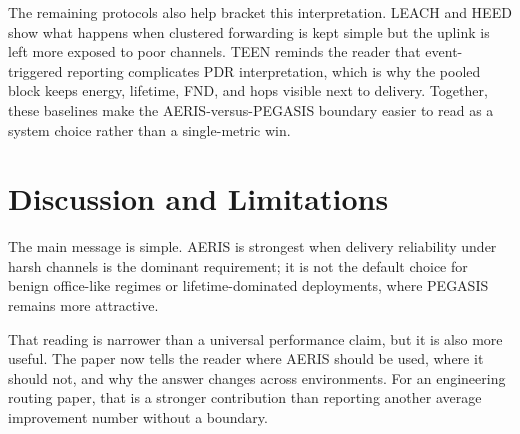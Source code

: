 \documentclass[letterpaper,conference]{IEEEtran}
\begin{document}
The remaining protocols also help bracket this interpretation. LEACH and HEED show what happens when clustered forwarding is kept simple but the uplink is left more exposed to poor channels. TEEN reminds the reader that event-triggered reporting complicates PDR interpretation, which is why the pooled block keeps energy, lifetime, FND, and hops visible next to delivery. Together, these baselines make the AERIS-versus-PEGASIS boundary easier to read as a system choice rather than a single-metric win.

\FloatBarrier
\section{Discussion and Limitations}
The main message is simple. AERIS is strongest when delivery reliability under harsh channels is the dominant requirement; it is not the default choice for benign office-like regimes or lifetime-dominated deployments, where PEGASIS remains more attractive.

That reading is narrower than a universal performance claim, but it is also more useful. The paper now tells the reader where AERIS should be used, where it should not, and why the answer changes across environments. For an engineering routing paper, that is a stronger contribution than reporting another average improvement number without a boundary.
\end{document}
